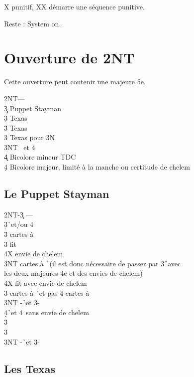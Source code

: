\documentclass[a4paper]{article}
\begin{document}
X punitif, XX démarre une séquence punitive.

Reste : System on.

\section{Ouverture de 2NT}

Cette ouverture peut contenir une majeure 5e.

\begin{bidtable}
2NT---\\
3\c \> Puppet Stayman\\
3\d \> Texas \h \\
3\h \> Texas \s \\
3\s \> Texas pour 3N\\
3NT \s\ et 4\h \\
4\c \> Bicolore mineur TDC\\
4\d \> Bicolore majeur, limité à la manche ou certitude de chelem
\end{bidtable}

\subsection{Le Puppet Stayman}

\begin{bidtable}
2NT-3\c \> ---\\
3\d {}\h\ et/ou 4\s \+\\
3\h {} cartes à \s \+\\
3\s \> fit \s \+\\
4X \> envie de chelem\-\\
3NT  cartes à \h\ (il est donc nécessaire de passer par 3\h\ avec\\
\>les deux majeures 4e et des envies de chelem)\\
\>4X fit avec envie de chelem\-\\
3\s {} cartes à \h\ et pas 4 cartes à \s \\
3NT -\h\ et 3-\s \\
4\d {}\h\ et 4\s\ sans envie de chelem\-\\
3\h {}\h \\
3\s {}\s \\
3NT -\h\ et 3-\s 
\end{bidtable}

\subsection{Les Texas}
\end{document}
